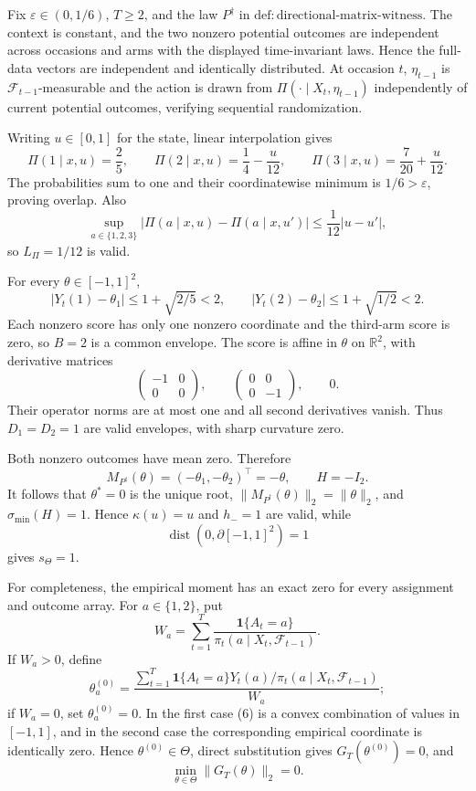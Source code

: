 Fix \(\varepsilon\in(0,1/6)\), \(T\ge2\), and the law \(P^{\dagger}\) in \(\mathrm{def:directional\text{-}matrix\text{-}witness}\). The context is constant, and the two nonzero potential outcomes are independent across occasions and arms with the displayed time-invariant laws. Hence the full-data vectors are independent and identically distributed. At occasion \(t\), \(\eta_{t-1}\) is \(\mathcal F_{t-1}\)-measurable and the action is drawn from \(\Pi(\cdot\mid X_t,\eta_{t-1})\) independently of current potential outcomes, verifying sequential randomization.

Writing \(u\in[0,1]\) for the state, linear interpolation gives
\[
 \Pi(1\mid x,u)=\frac25,\qquad
 \Pi(2\mid x,u)=\frac14-\frac{u}{12},\qquad
 \Pi(3\mid x,u)=\frac7{20}+\frac{u}{12}. \tag{1}
\]
The probabilities sum to one and their coordinatewise minimum is \(1/6>\varepsilon\), proving overlap. Also
\[
 \sup_{a\in\{1,2,3\}}|\Pi(a\mid x,u)-\Pi(a\mid x,u')|
 \le\frac1{12}|u-u'|, \tag{2}
\]
so \(L_\Pi=1/12\) is valid.

For every \(\theta\in[-1,1]^2\),
\[
 |Y_t(1)-\theta_1|\le1+\sqrt{2/5}<2,
 \qquad |Y_t(2)-\theta_2|\le1+\sqrt{1/2}<2. \tag{3}
\]
Each nonzero score has only one nonzero coordinate and the third-arm score is zero, so \(B=2\) is a common envelope. The score is affine in \(\theta\) on \(\mathbb R^2\), with derivative matrices
\[
 \begin{pmatrix}-1&0\\0&0\end{pmatrix},\qquad
 \begin{pmatrix}0&0\\0&-1\end{pmatrix},\qquad 0.
\]
Their operator norms are at most one and all second derivatives vanish. Thus \(D_1=D_2=1\) are valid envelopes, with sharp curvature zero.

Both nonzero outcomes have mean zero. Therefore
\[
 M_{P^{\dagger}}(\theta)=(-\theta_1,-\theta_2)^\top=-\theta,
 \qquad H=-I_2. \tag{4}
\]
It follows that \(\theta^*=0\) is the unique root, \(\|M_{P^{\dagger}}(\theta)\|_2=\|\theta\|_2\), and \(\sigma_{\min}(H)=1\). Hence \(\kappa(u)=u\) and \(h_-=1\) are valid, while
\[
 \operatorname{dist}(0,\partial[-1,1]^2)=1 \tag{5}
\]
gives \(s_\Theta=1\).

For completeness, the empirical moment has an exact zero for every assignment and outcome array. For \(a\in\{1,2\}\), put
\[
 W_a=\sum_{t=1}^T\frac{\mathbf1\{A_t=a\}}
 {\pi_t(a\mid X_t,\mathcal F_{t-1})}.
\]
If \(W_a>0\), define
\[
 \theta_a^{(0)}=
 \frac{\sum_{t=1}^T\mathbf1\{A_t=a\}Y_t(a)/
 \pi_t(a\mid X_t,\mathcal F_{t-1})}{W_a}; \tag{6}
\]
if \(W_a=0\), set \(\theta_a^{(0)}=0\). In the first case (6) is a convex combination of values in \([-1,1]\), and in the second case the corresponding empirical coordinate is identically zero. Hence \(\theta^{(0)}\in\Theta\), direct substitution gives \(G_T(\theta^{(0)})=0\), and
\[
 \min_{\theta\in\Theta}\|G_T(\theta)\|_2=0. \tag{7}
\]

